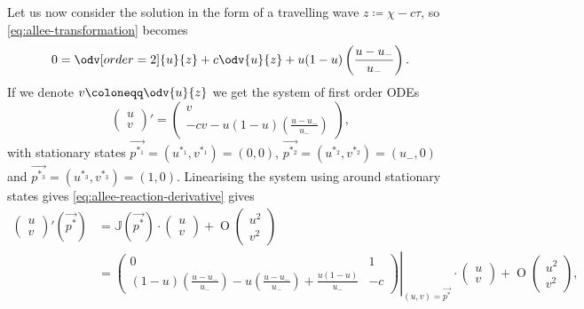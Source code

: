 Let us now consider the solution in the form of a travelling wave \(z \coloneqq \chi - c \tau\), so
    \cref{eq:allee-transformation} becomes
    \begin{equation}
        0 = \odv[order=2]{u}{z} + c \odv{u}{z} + u(1-u)\left( \frac{u - u_{-}}{u_{-}}\right).
    \end{equation}
If we denote \(v \coloneqq \odv{u}{z}\) we get the system of first order \acp{ODE} \[
        \begin{pmatrix}
            u \\ v
        \end{pmatrix}' = \begin{pmatrix}
            v \\ -cv - u(1-u)\left( \frac{u - u_{-}}{u_{-}} \right)
        \end{pmatrix},
    \] with stationary states \(\vec{p^{*_1}} = (u^{*_1}, v^{*_1}) = (0,0)\), \(\vec{p^{*_2}} = (u^{*_2}, v^{*_2} ) = (u_{-}, 0)\)
    and \(\vec{p^{*_3}} = (u^{*_3}, v^{*_3} ) = (1, 0)\).
Linearising the system using around stationary states gives \cref{eq:allee-reaction-derivative} gives \begin{equation}
    \begin{aligned}
    \begin{pmatrix}
        u \\ v
    \end{pmatrix}'\!\!\!(\vec{p^*}) &= 
    \mathbb{J}(\vec{p^*}) \cdot \begin{pmatrix} u\\v \end{pmatrix} + \mathop{O}\!\begin{pmatrix} u^2 \\ v^2
\end{pmatrix} \\[0.5em]
&= \left.\begin{pmatrix}
    0 & 1 \\
    (1 - u)\left( \frac{u - u_{-}}{u_{-}} \right) - u \left( \frac{u - u_{-}}{u_{-}} \right)
    + \frac{u(1 - u)}{u_{-}} & -c
    \end{pmatrix}\right|_{(u,v) = \vec{p^*}}\cdot\begin{pmatrix} u \\ v \end{pmatrix}
    + \mathop{O}\!\begin{pmatrix} u^2 \\ v^2 \end{pmatrix},
    \end{aligned}
    \end{equation}
